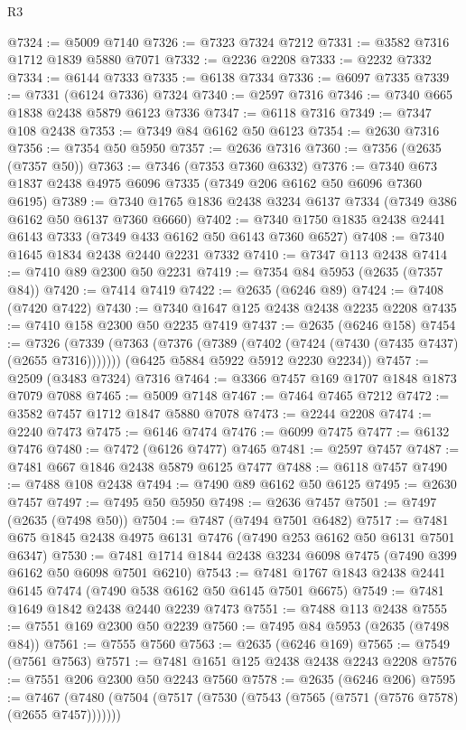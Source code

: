 \begin{lexlean}{R3}
\begin{coremodule}
@7324 := @5009 @7140
@7326 := @7323 @7324 @7212
@7331 := @3582 @7316 @1712 @1839 @5880 @7071
@7332 := @2236 @2208
@7333 := @2232 @7332
@7334 := @6144 @7333
@7335 := @6138 @7334
@7336 := @6097 @7335
@7339 := @7331 (@6124 @7336) @7324
@7340 := @2597 @7316
@7346 := @7340 @665 @1838 @2438 @5879 @6123 @7336
@7347 := @6118 @7316
@7349 := @7347 @108 @2438
@7353 := @7349 @84 @6162 @50 @6123
@7354 := @2630 @7316
@7356 := @7354 @50 @5950
@7357 := @2636 @7316
@7360 := @7356 (@2635 (@7357 @50))
@7363 := @7346 (@7353 @7360 @6332)
@7376 := @7340 @673 @1837 @2438 @4975 @6096 @7335 (@7349 @206 @6162 @50 @6096 @7360 @6195)
@7389 := @7340 @1765 @1836 @2438 @3234 @6137 @7334 (@7349 @386 @6162 @50 @6137 @7360 @6660)
@7402 := @7340 @1750 @1835 @2438 @2441 @6143 @7333 (@7349 @433 @6162 @50 @6143 @7360 @6527)
@7408 := @7340 @1645 @1834 @2438 @2440 @2231 @7332
@7410 := @7347 @113 @2438
@7414 := @7410 @89 @2300 @50 @2231
@7419 := @7354 @84 @5953 (@2635 (@7357 @84))
@7420 := @7414 @7419
@7422 := @2635 (@6246 @89)
@7424 := @7408 (@7420 @7422)
@7430 := @7340 @1647 @125 @2438 @2438 @2235 @2208
@7435 := @7410 @158 @2300 @50 @2235 @7419
@7437 := @2635 (@6246 @158)
@7454 := @7326
    (@7339
      (@7363 (@7376 (@7389 (@7402 (@7424 (@7430 (@7435 @7437) (@2655 @7316)))))))
      (@6425 @5884 @5922 @5912 @2230 @2234))
@7457 := @2509 (@3483 @7324) @7316
@7464 := @3366 @7457 @169 @1707 @1848 @1873 @7079 @7088
@7465 := @5009 @7148
@7467 := @7464 @7465 @7212
@7472 := @3582 @7457 @1712 @1847 @5880 @7078
@7473 := @2244 @2208
@7474 := @2240 @7473
@7475 := @6146 @7474
@7476 := @6099 @7475
@7477 := @6132 @7476
@7480 := @7472 (@6126 @7477) @7465
@7481 := @2597 @7457
@7487 := @7481 @667 @1846 @2438 @5879 @6125 @7477
@7488 := @6118 @7457
@7490 := @7488 @108 @2438
@7494 := @7490 @89 @6162 @50 @6125
@7495 := @2630 @7457
@7497 := @7495 @50 @5950
@7498 := @2636 @7457
@7501 := @7497 (@2635 (@7498 @50))
@7504 := @7487 (@7494 @7501 @6482)
@7517 := @7481 @675 @1845 @2438 @4975 @6131 @7476 (@7490 @253 @6162 @50 @6131 @7501 @6347)
@7530 := @7481 @1714 @1844 @2438 @3234 @6098 @7475 (@7490 @399 @6162 @50 @6098 @7501 @6210)
@7543 := @7481 @1767 @1843 @2438 @2441 @6145 @7474 (@7490 @538 @6162 @50 @6145 @7501 @6675)
@7549 := @7481 @1649 @1842 @2438 @2440 @2239 @7473
@7551 := @7488 @113 @2438
@7555 := @7551 @169 @2300 @50 @2239
@7560 := @7495 @84 @5953 (@2635 (@7498 @84))
@7561 := @7555 @7560
@7563 := @2635 (@6246 @169)
@7565 := @7549 (@7561 @7563)
@7571 := @7481 @1651 @125 @2438 @2438 @2243 @2208
@7576 := @7551 @206 @2300 @50 @2243 @7560
@7578 := @2635 (@6246 @206)
@7595 := @7467
    (@7480
      (@7504 (@7517 (@7530 (@7543 (@7565 (@7571 (@7576 @7578) (@2655 @7457)))))))

\end{coremodule}
\end{lexlean}
